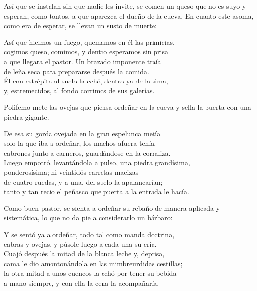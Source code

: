 Así que se instalan sin que nadie les invite, se comen un queso que no es suyo y esperan, como tontos, a que aparezca el dueño de la cueva. En cuanto este asoma, como era de esperar, se llevan un susto de muerte:

\begin{versocita}
Así que hicimos un fuego, quemamos en él las primicias,\\
cogimos queso, comimos, y dentro esperamos sin prisa\\
a que llegara el pastor. Un brazado imponente traía\\
de leña seca para prepararse después la comida.\\
Él con estrépito al suelo la echó, dentro ya de la sima,\\
y, estremecidos, al fondo corrimos de sus galerías.
\end{versocita}

Polifemo mete las ovejas que piensa ordeñar en la cueva y sella la puerta con una piedra gigante.

\begin{versocita}
De esa su gorda ovejada en la gran espelunca metía\\
solo la que iba a ordeñar, los machos afuera tenía,\\
cabrones junto a carneros, guardándose en la corraliza.\\
Luego empotró, levantándola a pulso, una piedra grandísima,\\
ponderosísima; ni veintidós carretas macizas\\
de cuatro ruedas, y a una, del suelo la apalancarían;\\
tanto y tan recio el peñasco que puerta a la entrada le hacía.
\end{versocita}

Como buen pastor, se sienta a ordeñar su rebaño de manera aplicada y sistemática, lo que no da pie a considerarlo un bárbaro:

\begin{versocita}
Y se sentó ya a ordeñar, todo tal como manda doctrina,\\
cabras y ovejas, y púsole luego a cada una su cría.\\
Cuajó después la mitad de la blanca leche y, deprisa,\\
cama le dio amontonándola en las mimbreurdidas cestillas;\\
la otra mitad a unos cuencos la echó por tener su bebida\\
a mano siempre, y con ella la cena la acompañaría.
\end{versocita}

